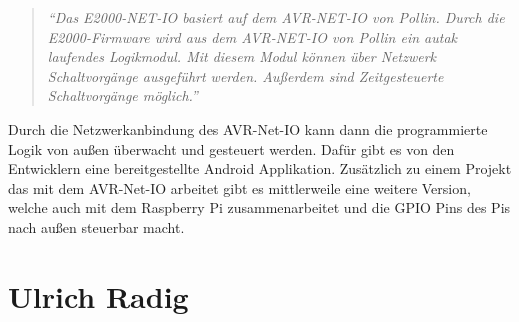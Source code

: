 \begin{quote}
	\textit{
		\enquote{Das E2000-NET-IO basiert auf dem AVR-NET-IO von Pollin. Durch die
		E2000-Firmware wird aus dem AVR-NET-IO von Pollin ein autak laufendes
		Logikmodul. Mit diesem Modul können über Netzwerk Schaltvorgänge ausgeführt
		werden. Außerdem sind Zeitgesteuerte Schaltvorgänge möglich.} }
	\cite{elektronik2000}
\end{quote}

Durch die Netzwerkanbindung des AVR-Net-IO kann dann die programmierte Logik von
außen überwacht und gesteuert werden. Dafür gibt es von den Entwicklern eine
bereitgestellte Android Applikation. Zusätzlich zu einem Projekt das mit dem
AVR-Net-IO arbeitet gibt es mittlerweile eine weitere Version, welche auch mit dem
Raspberry Pi zusammenarbeitet und die GPIO Pins des Pis nach außen steuerbar
macht.

\section{Ulrich Radig}

